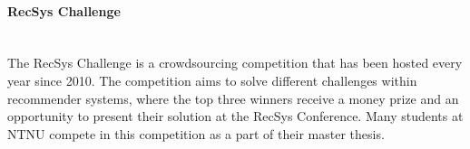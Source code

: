\paragraph*{RecSys Challenge} \hfill \\
The RecSys Challenge \cite{RECSYS} is a crowdsourcing competition that has been hosted every year since 2010. The competition aims to solve different challenges within recommender systems, where the top three winners receive a money prize and an opportunity to present their solution at the RecSys Conference. Many students at NTNU compete in this competition as a part of their master thesis.



